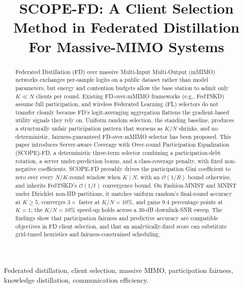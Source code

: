 \documentclass[journal]{IEEEtran}
\newcommand{\revIVE}[1]{#1}
\begin{document}
\title{SCOPE-FD: A Client Selection Method in Federated Distillation For Massive-MIMO Systems}

\author{
}

\maketitle

\begin{abstract}
\revIVE{Federated Distillation (FD) over massive Multi-Input Multi-Output (mMIMO) networks exchanges per-sample logits on a public dataset rather than model parameters, but energy and contention budgets allow the base station to admit only $K \ll N$ clients per round. Existing FD-over-mMIMO frameworks (e.g., FedTSKD) assume full participation, and wireless Federated Learning (FL) selectors do not transfer cleanly because FD's logit-averaging aggregation flattens the gradient-based utility signals they rely on. Uniform random selection, the standing baseline, produces a structurally unfair participation pattern that worsens as $K/N$ shrinks, and no deterministic, fairness-guaranteed FD-over-mMIMO selector has been proposed. This paper introduces Server-aware Coverage with Over-round Participation Equalization (SCOPE)-FD, a deterministic three-term selector combining a participation-debt rotation, a server under-prediction bonus, and a class-coverage penalty, with fixed non-negative coefficients. SCOPE-FD provably drives the participation Gini coefficient to zero over every $N/K$-round window when $K \mid N$, with an $\mathcal{O}(1/R)$ bound otherwise, and inherits FedTSKD's $\mathcal{O}(1/t)$ convergence bound. On Fashion-MNIST and MNIST under Dirichlet non-IID partitions, it matches uniform random's final-round accuracy at $K \ge 5$, converges $3\times$ faster at $K/N = 10\%$, and gains $9.4$ percentage points at $K = 1$; the $K/N = 10\%$ speed-up holds across a $30$-dB downlink-SNR sweep. The findings show that participation fairness and predictive accuracy are compatible objectives in FD client selection, and that an analytically-fixed score can substitute grid-tuned heuristics and fairness-constrained scheduling. }

\end{abstract}

\begin{IEEEkeywords}
Federated distillation, client selection, massive MIMO, participation fairness, knowledge distillation, communication efficiency.
\end{IEEEkeywords}
\end{document}
